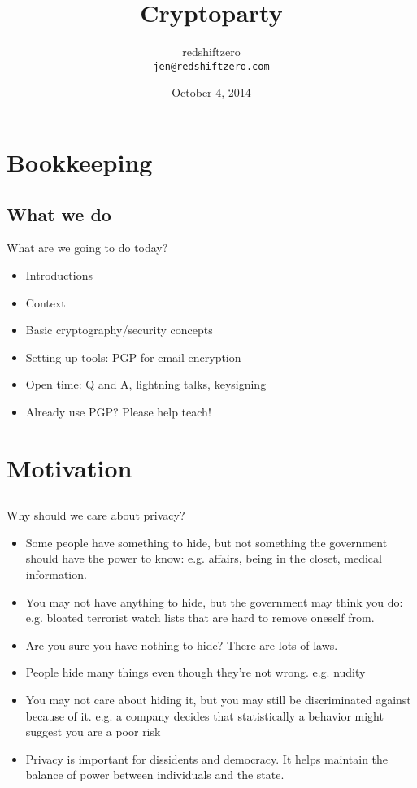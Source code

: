 \documentclass{beamer}
\author[redshiftzero]{redshiftzero\\ \texttt{jen@redshiftzero.com}}
\institute[SSH:C]{Southside Hackerspace: Chicago}
\title[Cryptoparty]{Cryptoparty}
\date[October 2014]{October 4, 2014}
\begin{document}
\begin{frame}[plain]
   \titlepage
\end{frame}


\section{Bookkeeping}
\subsection{What we do}

\begin{frame}{What are we going to do today?}

\begin{itemize}
  \item Introductions
  \item Context 
  \item Basic cryptography/security concepts
  \item Setting up tools: PGP for email encryption
  \item Open time: Q and A, lightning talks, keysigning 
  \item Already use PGP? Please help teach!
\end{itemize}

\end{frame}

\section{Motivation}
\subsection{}

\begin{frame}{Why should we care about privacy?}

\begin{itemize}
   \item<1->{Some people have something to hide, but not something the government should have the power to know: e.g. affairs, being in the closet, medical information.}
   \item<2->{You may not have anything to hide, but the government may think you do: e.g. bloated terrorist watch lists that are hard to remove oneself from.}
   \item<3->{Are you sure you have nothing to hide? There are lots of laws.}
   \item<4->{People hide many things even though they're not wrong. e.g. nudity}
   \item<5->{You may not care about hiding it, but you may still be discriminated against because of it. e.g. a company decides that statistically a behavior might suggest you are a poor risk}
   \item<6->{Privacy is important for dissidents and democracy. It helps maintain the balance of power between individuals and the state.}
\end{itemize}

\end{frame}
\end{document}
